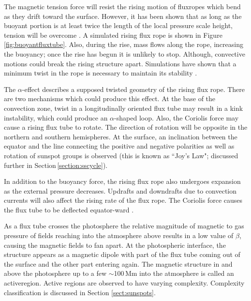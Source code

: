 The magnetic tension force will resist the rising motion of \glspl{fluxrope} which bend as they drift toward the surface. However, it has been shown that as long as the buoyant portion is at least twice the length of the local pressure scale height, tension will be overcome \citep{Parker:1955b}. A simulated rising flux rope is shown in Figure\,\ref{fig:buoyantfluxtube}. Also, during the rise, mass flows along the rope, increasing the buoyancy; once the rise has begun it is unlikely to stop. Although, convective motions could break the rising structure apart. Simulations have shown that a minimum twist in the rope is necessary to maintain its stability \citep[][and references therein]{Fan:2009}. 

The $\alpha$-effect describes a supposed twisted geometry of the rising flux rope. 
There are two mechanisms which could produce this effect. At the base of the convection zone, twist in a longitudinally oriented flux tube may result in a kink instability, which could produce an $\alpha$-shaped loop. 
Also, the Coriolis force may cause a rising flux tube to rotate. The direction of rotation will be opposite in the northern and southern hemispheres. At the surface, an inclination between the equator and the line connecting the positive and negative polarities as well as rotation of sunspot groups is observed (this is known as ``Joy's Law"; discussed further in Section\,\ref{section:sscycle}).

In addition to the buoyancy force, the rising flux rope also undergoes expansion as the external pressure decreases. Updrafts and downdrafts due to convection currents will also affect the rising rate of the flux rope. The Coriolis force causes the flux tube to be deflected equator-ward \citep{Choudhuri:1987}. %


As a flux tube crosses the photosphere the relative magnitude of magnetic to gas pressure of fields reaching into the atmosphere above results in a low value of $\beta$, causing the magnetic fields to fan apart. At the photospheric interface, the structure appears as a magnetic dipole with part of the flux tube coming out of the surface and the other part entering again. The magnetic structure in and above the photosphere up to a few $\sim$100\,Mm into the atmosphere is called an \gls{activeregion}. Active regions are observed to have varying complexity. Complexity classification is discussed in Section \ref{sect:sunspots}.

